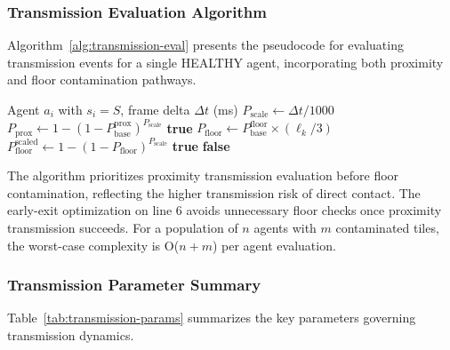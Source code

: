 \subsubsection{Transmission Evaluation Algorithm}

Algorithm~\ref{alg:transmission-eval} presents the pseudocode for evaluating transmission events for a single HEALTHY agent, incorporating both proximity and floor contamination pathways.

\begin{algorithm}[t]
\caption{evaluateTransmission($a_i$, $\Delta t$)}
\label{alg:transmission-eval}
\begin{algorithmic}[1]
\REQUIRE Agent $a_i$ with $s_i = S$, frame delta $\Delta t$ (ms)
\STATE $P_{\text{scale}} \leftarrow \Delta t / 1000$
        \STATE $P_{\text{prox}} \leftarrow 1 - (1 - P_{\text{base}}^{\text{prox}})^{P_{\text{scale}}}$
            \RETURN \textbf{true} 
        \ENDIF
    \ENDIF
\ENDFOR
{}
        \STATE $P_{\text{floor}} \leftarrow P_{\text{base}}^{\text{floor}} \times (\ell_k / 3)$
        \STATE $P_{\text{floor}}^{\text{scaled}} \leftarrow 1 - (1 - P_{\text{floor}})^{P_{\text{scale}}}$
            \RETURN \textbf{true} 
        \ENDIF
    \ENDIF
\ENDFOR
\RETURN \textbf{false} 
\end{algorithmic}
\end{algorithm}

The algorithm prioritizes proximity transmission evaluation before floor contamination, reflecting the higher transmission risk of direct contact. The early-exit optimization on line 6 avoids unnecessary floor checks once proximity transmission succeeds. For a population of $n$ agents with $m$ contaminated tiles, the worst-case complexity is O($n + m$) per agent evaluation.

\subsubsection{Transmission Parameter Summary}

Table~\ref{tab:transmission-params} summarizes the key parameters governing transmission dynamics.

